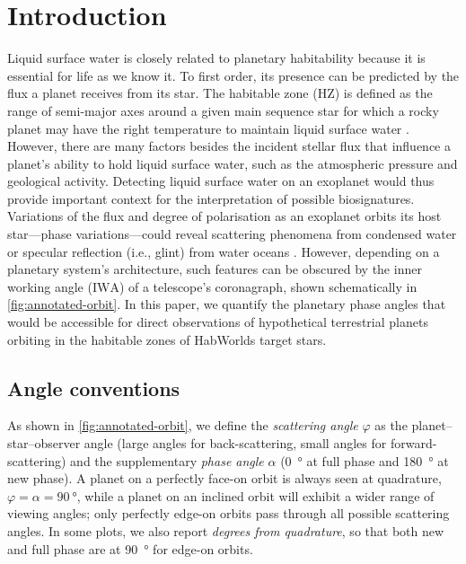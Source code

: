 \documentclass[usenatbib]{mnras}
\newcommand{\IWA}{\ensuremath{\mathrm{IWA}}\xspace}
\newcommand{\HWO}{HabWorlds\xspace}
\begin{document}
\section{Introduction}
\label{sec:intro}



Liquid surface water is closely related to planetary habitability because it is essential for life as we know it.
%
To first order, its presence can be predicted by the flux a planet receives from its star.
%
The habitable zone (HZ) is defined as the range of semi-major axes around a given main sequence star for which a rocky planet may have the right temperature to maintain liquid surface water \citep{kasting93}. 
%
However, there are many factors besides the incident stellar flux that influence a planet's ability to hold liquid surface water, such as the atmospheric pressure and geological activity. 
%
Detecting liquid surface water on an exoplanet would thus provide important context for the interpretation of possible biosignatures.
%
Variations of the flux and degree of polarisation as an exoplanet orbits its host star---phase variations---could reveal scattering phenomena from condensed water \citep[e.g., rainbows;][]{bailey2007} or specular reflection (i.e., glint) from water oceans \citep[e.g.][]{McCullough_2006,2008Icar..195..927W}.
%
However, depending on a planetary system's architecture, such features can be obscured by the inner working angle (\IWA) of a telescope's coronagraph, shown schematically in \cref{fig:annotated-orbit}.
%
In this paper, we quantify the planetary phase angles that would be accessible for direct observations of hypothetical terrestrial planets orbiting in the habitable zones of \HWO target stars.


\subsection{Angle conventions}

As shown in \cref{fig:annotated-orbit}, we define the \emph{scattering angle} $\varphi$ as the planet--star--observer angle (large angles for back-scattering, small angles for forward-scattering) and the supplementary \emph{phase angle} $\alpha$ (\qty{0}{\degree} at full phase and \qty{180}{\degree} at new phase). 
%
A planet on a perfectly face-on orbit is always seen at quadrature, $\varphi = \alpha = \qty{90}{\degree}$, while a planet on an inclined orbit will exhibit a wider range of viewing angles; only perfectly edge-on orbits pass through all possible scattering angles. 
%
In some plots, we also report \emph{degrees from quadrature}, so that both new and full phase are at \qty{90}{\degree} for edge-on orbits.
\end{document}
